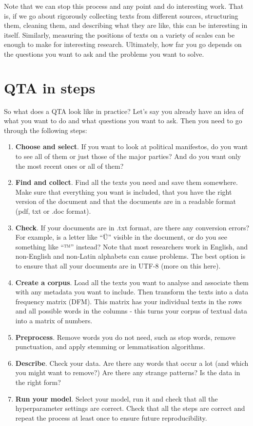 \documentclass[
]{book}
\begin{document}
Note that we can stop this process and any point and do interesting work. That is, if we go about rigorously collecting texts from different sources, structuring them, cleaning them, and describing what they are like, this can be interesting in itself. Similarly, measuring the positions of texts on a variety of scales can be enough to make for interesting research. Ultimately, how far you go depends on the questions you want to ask and the problems you want to solve.

\section{QTA in steps}\label{qta-in-steps}

So what does a QTA look like in practice? Let's say you already have an idea of what you want to do and what questions you want to ask. Then you need to go through the following steps:

\begin{enumerate}
\def\labelenumi{\arabic{enumi}.}
\item
  \textbf{Choose and select}. If you want to look at political manifestos, do you want to see all of them or just those of the major parties? And do you want only the most recent ones or all of them?
\item
  \textbf{Find and collect}. Find all the texts you need and save them somewhere. Make sure that everything you want is included, that you have the right version of the document and that the documents are in a readable format (pdf, txt or .doc format).
\item
  \textbf{Check}. If your documents are in .txt format, are there any conversion errors? For example, is a letter like ``Ü'' visible in the document, or do you see something like ``™'' instead? Note that most researchers work in English, and non-English and non-Latin alphabets can cause problems. The best option is to ensure that all your documents are in UTF-8 (more on this here).
\item
  \textbf{Create a corpus}. Load all the texts you want to analyse and associate them with any metadata you want to include. Then transform the texts into a data frequency matrix (DFM). This matrix has your individual texts in the rows and all possible words in the columns - this turns your corpus of textual data into a matrix of numbers.
\item
  \textbf{Preprocess}. Remove words you do not need, such as stop words, remove punctuation, and apply stemming or lemmatisation algorithms.
\item
  \textbf{Describe}. Check your data. Are there any words that occur a lot (and which you might want to remove?) Are there any strange patterns? Is the data in the right form?
\item
  \textbf{Run your model}. Select your model, run it and check that all the hyperparameter settings are correct. Check that all the steps are correct and repeat the process at least once to ensure future reproducibility.
\end{enumerate}
\end{document}
